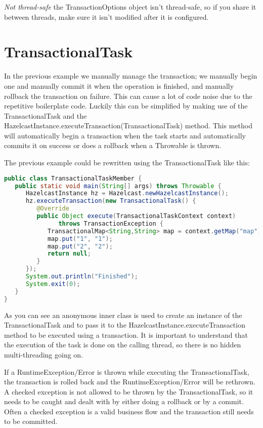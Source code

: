 \emph{Not thread-safe} the TransactionOptions object isn't thread-safe, so if you share it between threads, make sure it isn't modified after it is configured. 

\section{TransactionalTask}
In the previous example we manually manage the transaction; we manually begin one and manually commit it when the operation is finished, and manually rollback the transaction on failure. This can cause a lot of code noise due to the repetitive boilerplate code. Luckily this can be simplified by making use of the TransactionalTask and the HazelcastInstance.executeTransaction(TransactionalTask) method. This method will automatically begin a transaction when the task starts and automatically commits it on success or does a rollback when a Throwable is thrown. 

The previous example could be rewritten using the TransactionalTask like this:
\begin{lstlisting}[language=java]
public class TransactionalTaskMember {
   public static void main(String[] args) throws Throwable {
      HazelcastInstance hz = Hazelcast.newHazelcastInstance();
      hz.executeTransaction(new TransactionalTask() {
         @Override
         public Object execute(TransactionalTaskContext context) 
               throws TransactionException {
            TransactionalMap<String,String> map = context.getMap("map");
            map.put("1", "1");
            map.put("2", "2");
            return null;
         }
      });
      System.out.println("Finished");
      System.exit(0);
   }
}
\end{lstlisting}
As you can see an anonymous inner class is used to create an instance of the TransactionalTask and to pass it to the HazelcastInstance.executeTransaction method to be executed using a transaction. It is important to understand that the execution of the task is done on the calling thread, so there is no hidden multi-threading going on.

If a RuntimeException/Error is thrown while executing the TransactionalTask, the transaction is rolled back and the RuntimeException/Error will be rethrown. A checked exception is not allowed to be thrown by the TransactionalTask, so it needs to be caught and dealt with by either doing a rollback or by a commit. Often a checked exception is a valid business flow and the transaction still needs to be committed. 

